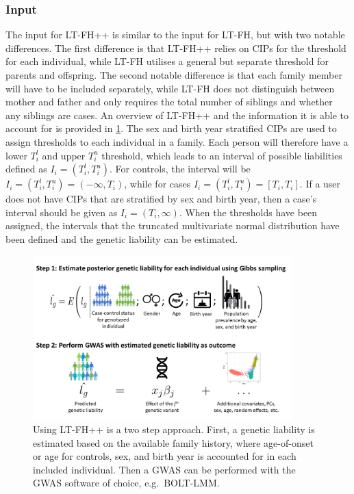 \subsubsection{Input}
The input for LT-FH++ is similar to the input for LT-FH, but with two notable differences. The first difference is that LT-FH++ relies on CIPs for the threshold for each individual, while LT-FH utilises a general but separate threshold for parents and offspring. The second notable difference is that each family member will have to be included separately, while LT-FH does not distinguish between mother and father and only requires the total number of siblings and whether any siblings are cases. An overview of LT-FH++ and the information it is able to account for is provided in \cref{fig:LTFHppFigure1}. The sex and birth year stratified CIPs are used to assign thresholds to each individual in a family. Each person will therefore have a lower $ T_i^l $ and upper $ T_i^u $ threshold, which leads to an interval of possible liabilities defined as $ I_i = (T_i^l, T_i^u) $. For controls, the interval will be $ I_i = (T_i^l,T_i^u) = (-\infty, T_i) $, while for cases $ I_i = (T_i^l,T_i^u) = [T_i,T_i] $. If a user does not have CIPs that are stratified by sex and birth year, then a case's interval should be given as $ I_i = (T_i, \infty) $. When the thresholds have been assigned, the intervals that the truncated multivariate normal distribution have been defined and the genetic liability can be estimated. 

\begin{figure}
	\includegraphics[width=10cm]{methods/ltfhpp_steps.png}
	\caption[Overview of LT-FH++ and what information it can account for in GWAS]{
		Using LT-FH++ is a two step approach. First, a genetic liability is estimated based on the available family history, where age-of-onset or age for controls, sex, and birth year is accounted for in each included individual. Then a GWAS can be performed with the GWAS software of choice, e.g.\ BOLT-LMM.
	} %
	\label{fig:LTFHppFigure1}
\end{figure}

